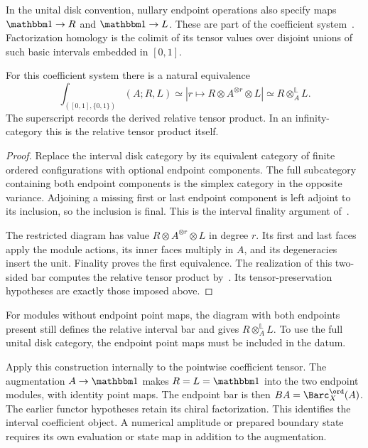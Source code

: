 In the unital disk convention, nullary endpoint operations also specify maps $\mathbbm1\to R$ and $\mathbbm1\to L$. These are part of the coefficient system~\cite[Definition~2.30]{AFT}. Factorization homology is the colimit of its tensor values over disjoint unions of such basic intervals embedded in $[0,1]$.

\begin{proposition}\label{cbc:internal:interval}
For this coefficient system there is a natural equivalence
\[
 \int_{([0,1],\{0,1\})}(A;R,L)
 \simeq\left|r\longmapsto R\otimes A^{\otimes r}\otimes L\right|
 \simeq R\otimes_A^{\mathbb L}L.
\]
The superscript records the derived relative tensor product. In an infinity-category this is the relative tensor product itself.
\end{proposition}
\begin{proof}
Replace the interval disk category by its equivalent category of finite ordered configurations with optional endpoint components. The full subcategory containing both endpoint components is the simplex category in the opposite variance. Adjoining a missing first or last endpoint component is left adjoint to its inclusion, so the inclusion is final. This is the interval finality argument of~\cite[Observations~2.31--2.32 and Proposition~2.34]{AFT}.

The restricted diagram has value $R\otimes A^{\otimes r}\otimes L$ in degree $r$. Its first and last faces apply the module actions, its inner faces multiply in $A$, and its degeneracies insert the unit. Finality proves the first equivalence. The realization of this two-sided bar computes the relative tensor product by~\cite[Theorem~4.4.2.8 and Example~4.4.2.11]{LurieHA}. Its tensor-preservation hypotheses are exactly those imposed above.
\end{proof}

For modules without endpoint point maps, the diagram with both endpoints present still defines the relative interval bar and gives $R\otimes_A^{\mathbb L}L$. To use the full unital disk category, the endpoint point maps must be included in the datum.

Apply this construction internally to the pointwise coefficient tensor. The augmentation $A\to\mathbbm1$ makes $R=L=\mathbbm1$ into the two endpoint modules, with identity point maps. The endpoint bar is then $BA=\Barc_X^{\ord}(A)$. The earlier functor hypotheses retain its chiral factorization. This identifies the interval coefficient object. A numerical amplitude or prepared boundary state requires its own evaluation or state map in addition to the augmentation.

